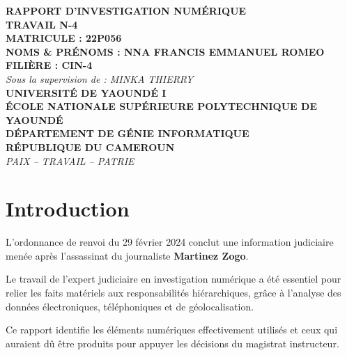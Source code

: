 \documentclass[12pt,a4paper]{article}
\begin{document}
\begin{center}
\textbf{\Large RAPPORT D’INVESTIGATION NUMÉRIQUE}\\[1em]
\textbf{TRAVAIL N-4}\\[0.5em]
\textbf{MATRICULE : 22P056}\\
\textbf{NOMS \& PRÉNOMS : NNA FRANCIS EMMANUEL ROMEO}\\
\textbf{FILIÈRE : CIN-4}\\[2em]
\textit{Sous la supervision de : MINKA THIERRY}\\[2em]
\textbf{UNIVERSITÉ DE YAOUNDÉ I}\\
\textbf{ÉCOLE NATIONALE SUPÉRIEURE POLYTECHNIQUE DE YAOUNDÉ}\\
\textbf{DÉPARTEMENT DE GÉNIE INFORMATIQUE}\\[2em]
\textbf{RÉPUBLIQUE DU CAMEROUN}\\
\textit{PAIX – TRAVAIL – PATRIE}
\end{center}

\newpage
\tableofcontents
\newpage

\section{Introduction}
L’ordonnance de renvoi du 29 février 2024 conclut une information judiciaire menée après l’assassinat du journaliste \textbf{Martinez Zogo}. 

Le travail de l’expert judiciaire en investigation numérique a été essentiel pour relier les faits matériels aux responsabilités hiérarchiques, grâce à l’analyse des données électroniques, téléphoniques et de géolocalisation. 

Ce rapport identifie les éléments numériques effectivement utilisés et ceux qui auraient dû être produits pour appuyer les décisions du magistrat instructeur.
\end{document}
